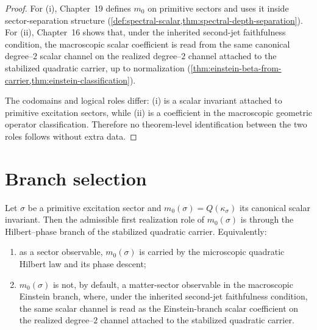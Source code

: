 \begin{proof}
For \textup{(i)}, Chapter~19 defines \(m_0\) on primitive sectors and uses
it inside sector-separation structure
(\cref{def:spectral-scalar,thm:spectral-depth-separation}).
For \textup{(ii)}, Chapter~16 shows that, under the inherited
second-jet faithfulness condition, the macroscopic scalar coefficient is
read from the same canonical degree--\(2\) scalar channel on the
realized degree--\(2\) channel attached to the stabilized quadratic
carrier, up to normalization
(\cref{thm:einstein-beta-from-carrier,thm:einstein-classification}).

The codomains and logical roles differ: \textup{(i)} is a scalar invariant
attached to primitive excitation sectors, while \textup{(ii)} is a
coefficient in the macroscopic geometric operator classification.
Therefore no theorem-level identification between the two roles follows
without extra data.
\end{proof}

\section{Branch selection}
\label{sec:matter-realization-branch}

\begin{theorem}
\label{thm:matter-branch-selection}
Let \(\sigma\) be a primitive excitation sector and
\(m_0(\sigma)=Q(\kappa_\sigma)\) its canonical scalar invariant.
Then the admissible first realization role of \(m_0(\sigma)\) is through
the Hilbert--phase branch of the stabilized quadratic carrier.
Equivalently:
\begin{enumerate}[label=\textup{(\roman*)}]
\item
      as a sector observable, \(m_0(\sigma)\) is carried by the
      microscopic quadratic Hilbert law and its phase descent;
\item
      \(m_0(\sigma)\) is not, by default, a matter-sector observable in
      the macroscopic Einstein branch, where, under the inherited
      second-jet faithfulness condition, the same scalar channel is read
      as the Einstein-branch scalar coefficient on the realized
      degree--\(2\) channel attached to the stabilized quadratic
      carrier.
\end{enumerate}
\end{theorem}

